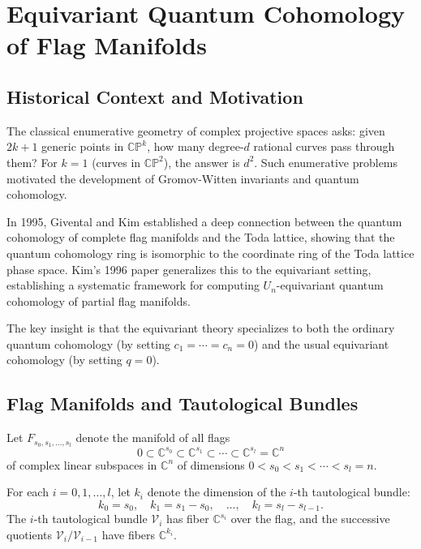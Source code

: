 
\chapter{Equivariant Quantum Cohomology of Flag Manifolds}
\label{chap:EquivariantQuantum}

\section{Historical Context and Motivation}

The classical enumerative geometry of complex projective spaces asks: given $2k+1$ generic points in $\mathbb{CP}^k$, how many degree-$d$ rational curves pass through them? For $k=1$ (curves in $\mathbb{CP}^2$), the answer is $d^2$. Such enumerative problems motivated the development of Gromov-Witten invariants and quantum cohomology.

In 1995, Givental and Kim \cite{GiventalKim1995} established a deep connection between the quantum cohomology of complete flag manifolds and the Toda lattice, showing that the quantum cohomology ring is isomorphic to the coordinate ring of the Toda lattice phase space. Kim's 1996 paper \cite{Kim1996} generalizes this to the equivariant setting, establishing a systematic framework for computing $U_n$-equivariant quantum cohomology of partial flag manifolds.

The key insight is that the equivariant theory specializes to both the ordinary quantum cohomology (by setting $c_1 = \cdots = c_n = 0$) and the usual equivariant cohomology (by setting $q = 0$).

\section{Flag Manifolds and Tautological Bundles}

Let $F_{s_0, s_1, \ldots, s_l}$ denote the manifold of all flags
\begin{equation}
0 \subset \mathbb{C}^{s_0} \subset \mathbb{C}^{s_1} \subset \cdots \subset \mathbb{C}^{s_l} = \mathbb{C}^n
\end{equation}
of complex linear subspaces in $\mathbb{C}^n$ of dimensions $0 < s_0 < s_1 < \cdots < s_l = n$.

\begin{Definition}
\label{def:TautologicalBundles}
For each $i = 0, 1, \ldots, l$, let $k_i$ denote the dimension of the $i$-th tautological bundle:
\begin{equation}
k_0 = s_0, \quad k_1 = s_1 - s_0, \quad \ldots, \quad k_l = s_l - s_{l-1}.
\end{equation}
The $i$-th tautological bundle $\mathcal{V}_i$ has fiber $\mathbb{C}^{s_i}$ over the flag, and the successive quotients $\mathcal{V}_i / \mathcal{V}_{i-1}$ have fibers $\mathbb{C}^{k_i}$.
\end{Definition}

